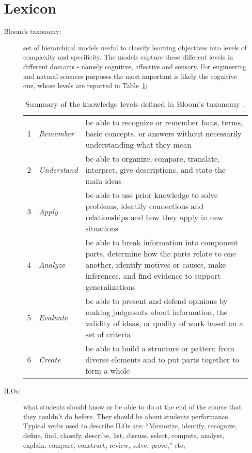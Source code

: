 \section{Lexicon}
\label{sec:lexicon}

\begin{description}

	\item[Bloom's taxonomy:] set of hierarchical models useful to classify learning objectives into levels of complexity and specificity. The models capture these different levels in different domains - namely cognitive, affective and sensory. For engineering and natural sciences purposes the most important is likely the cognitive one, whose levels are reported in Table~\ref{tab:blooms-taxonomy};

		\begin{table}[!htbp]
			\centering
			\begin{tabular}{|llp{}|}
				\hline
				1 & \emph{Remember} & be able to recognize or remember facts, terms, basic concepts, or answers without necessarily understanding what they mean \\
				2 & \emph{Understand} & be able to organize, compare, translate, interpret, give descriptions, and state the main ideas \\
				3 & \emph{Apply} & be able to use prior knowledge to solve problems, identify connections and relationships and how they apply in new situations \\
				4 & \emph{Analyze} & be able to break information into component parts, determine how the parts relate to one another, identify motives or causes, make inferences, and find evidence to support generalizations \\
				5 & \emph{Evaluate} & be able to present and defend opinions by making judgments about information, the validity of ideas, or quality of work based on a set of criteria \\
				6 & \emph{Create} & be able to build a structure or pattern from diverse elements and to put parts together to form a whole \\
				\hline
			\end{tabular}
			\caption{Summary of the knowledge levels defined in Bloom's taxonomy~\cite{bloom1956taxonomy}.}
			\label{tab:blooms-taxonomy}
		\end{table}

	\item[\acfp{ILO}:] what students should know or be able to do at the end of the course that they couldn't do before. They should be about students performance. Typical verbs used to describe \acp{ILO} are: ``Memorize, identify, recognize, define, find, classify, describe, list, discuss, select, compute, analyse, explain, compare, construct, review, solve, prove,'' etc;


\end{description}
